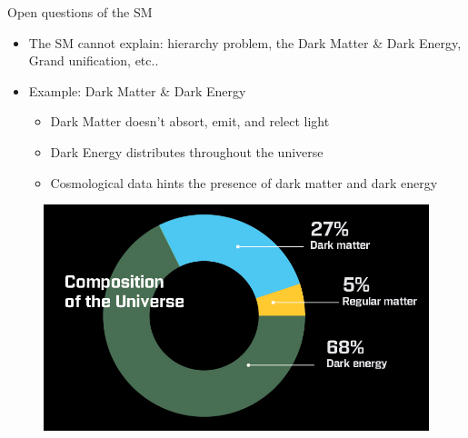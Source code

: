 \documentclass[10pt]{beamer}
\begin{document}
\begin{frame}{Open questions of the SM}
    \begin{itemize}
        \item The SM cannot explain: hierarchy problem, the Dark Matter \& Dark Energy, Grand unification, etc..
        \item Example: Dark Matter \& Dark Energy
        \begin{itemize}
            \item Dark Matter doesn't absort, emit, and relect light
            \item Dark Energy distributes throughout the universe
            \item Cosmological data hints the presence of dark matter and dark energy
        \end{itemize}
    \end{itemize}
    \begin{figure}
        \includegraphics[scale=0.33]{figures/composition-of-universe.jpg}
    \end{figure}
\end{frame}
\end{document}
